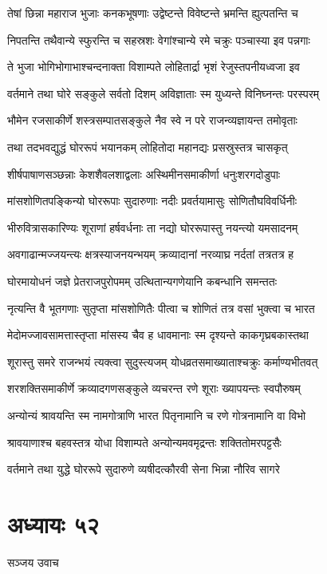 \twolineshloka
{तेषां छिन्ना महाराज भुजाः कनकभूषणाः}
{उद्वेष्टन्ते विवेष्टन्ते भ्रमन्ति ह्युत्पतन्ति च}


\twolineshloka
{निपतन्ति तथैवान्ये स्फुरन्ति च सहस्रशः}
{वेगांश्चान्ये रमे चक्रुः पञ्चास्या इव पन्नगाः}


\twolineshloka
{ते भुजा भोगिभोगाभाश्चन्दनाक्ता विशाम्पते}
{लोहितार्द्रा भृशं रेजुस्तपनीयध्वजा इव}


\twolineshloka
{वर्तमाने तथा घोरे सङ्कुले सर्वतो दिशम्}
{अविज्ञाताः स्म युध्यन्ते विनिघ्नन्तः परस्परम्}


\twolineshloka
{भौमेन रजसाकीर्णे शस्त्रसम्पातसङ्कुले}
{नैव स्वे न परे राजन्व्यज्ञायन्त तमोवृताः}


\twolineshloka
{तथा तदभवद्युद्धं घोररूपं भयानकम्}
{लोहितोदा महानद्यः प्रसस्रुस्तत्र चासकृत्}


\twolineshloka
{शीर्षपाषाणसञ्छन्नाः केशशैवलशाद्वलाः}
{अस्थिमीनसमाकीर्णा धनुःशरगदोडुपाः}


\twolineshloka
{मांसशोणितपङ्किन्यो घोररूपाः सुदारुणाः}
{नदीः प्रवर्तयामासुः सोणितौघविवर्धिनीः}


\twolineshloka
{भीरुवित्रासकारिण्यः शूराणां हर्षवर्धनाः}
{ता नद्यो घोररूपास्तु नयन्त्यो यमसादनम्}


\twolineshloka
{अवगाढान्मज्जयन्त्यः क्षत्रस्याजनयन्भयम्}
{क्रव्यादानां नरव्याघ्र नर्दतां तत्रतत्र ह}


\twolineshloka
{घोरमायोधनं जज्ञे प्रेतराजपुरोपमम्}
{उत्थितान्यगणेयानि कबन्धानि समन्ततः}


\twolineshloka
{नृत्यन्ति वै भूतगणाः सुतृप्ता मांसशोणितैः}
{पीत्वा च शोणितं तत्र वसां भुक्त्वा च भारत}


\twolineshloka
{मेदोमज्जावसामत्तास्तृप्ता मांसस्य चैव ह}
{धावमानाः स्म दृश्यन्ते काकगृघ्रबकास्तथा}


\twolineshloka
{शूरास्तु समरे राजन्भयं त्यक्त्वा सुदुस्त्यजम्}
{योधव्रतसमाख्याताश्चक्रुः कर्माण्यभीतवत्}


\twolineshloka
{शरशक्तिसमाकीर्णे क्रव्यादगणसङ्कुले}
{व्यचरन्त रणे शूराः ख्यापयन्तः स्वपौरुषम्}


\twolineshloka
{अन्योन्यं श्रावयन्ति स्म नामगोत्राणि भारत}
{पितृनामानि च रणे गोत्रनामानि वा विभो}


\twolineshloka
{श्रावयाणाश्च बहवस्तत्र योधा विशाम्पते}
{अन्योन्यमवमृद्रन्तः शक्तितोमरपट्टसैः}


\twolineshloka
{वर्तमाने तथा युद्धे घोररूपे सुदारुणे}
{व्यषीदत्कौरवी सेना भिन्ना नौरिव सागरे}


\chapter{अध्यायः ५२}
\twolineshloka
{सञ्जय उवाच}
{}


